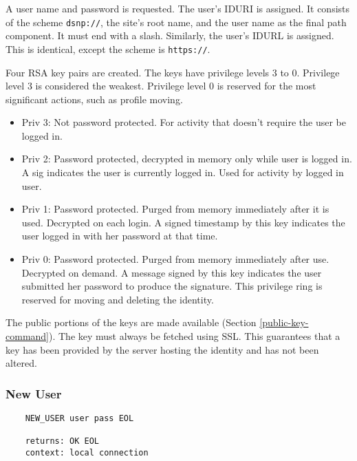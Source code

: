\documentclass[letterpaper,11pt,oneside]{article}
\begin{document}
A user name and password is requested. The user's IDURI is assigned. It
consists of the scheme \verb'dsnp://', the site's root name, and the user name
as the final path component. It must end with a slash. Similarly, the user's
IDURL is assigned. This is identical, except the scheme is \verb'https://'.

%
%

Four RSA key pairs are created. The keys have privilege levels 3 to 0.
Privilege level 3 is considered the weakest. Privilege level 0 is reserved for
the most significant actions, such as profile moving.

\begin{itemize}
\item Priv 3: Not password protected. For activity that doesn't require the user be logged
in.

\item Priv 2: Password protected, decrypted in memory only while user is logged
in. A sig indicates the user is currently logged in. Used for activity by
logged in user.

\item Priv 1: Password protected. Purged from memory immediately after it is
used. Decrypted on each login. A signed timestamp by this key indicates the
user logged in with her password at that time.

\item Priv 0: Password protected. Purged from memory immediately after use.
Decrypted on demand. A message signed by this key indicates the user submitted
her password to produce the signature. This privilege ring is reserved for
moving and deleting the identity.
\end{itemize}

The public portions of the keys are made available (Section
\ref{public-key-command}). The key must always be fetched using SSL. This
guarantees that a key has been provided by the server hosting the identity and
has not been altered.

\subsubsection{New User}

\vspace{10pt}
\begin{verbatim}
    NEW_USER user pass EOL

    returns: OK EOL
    context: local connection
\end{verbatim}
\end{document}
